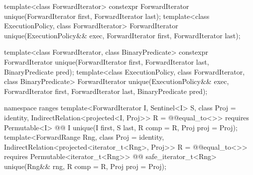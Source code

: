 %
\begin{itemdecl}
template<class ForwardIterator>
  constexpr ForwardIterator unique(ForwardIterator first, ForwardIterator last);
template<class ExecutionPolicy, class ForwardIterator>
  ForwardIterator unique(ExecutionPolicy&& exec,
                         ForwardIterator first, ForwardIterator last);

template<class ForwardIterator, class BinaryPredicate>
  constexpr ForwardIterator unique(ForwardIterator first, ForwardIterator last,
                                   BinaryPredicate pred);
template<class ExecutionPolicy, class ForwardIterator, class BinaryPredicate>
  ForwardIterator unique(ExecutionPolicy&& exec,
                         ForwardIterator first, ForwardIterator last,
                         BinaryPredicate pred);
\end{itemdecl}
\begin{addedblock}
%
\begin{itemdecl}
namespace ranges {
  template<ForwardIterator I, Sentinel<I> S, class Proj = identity,
      IndirectRelation<projected<I, Proj>> R = @@equal_to<>>
    requires Permutable<I>
    @@ I unique(I first, S last, R comp = R{}, Proj proj = Proj{});
  template<ForwardRange Rng, class Proj = identity,
      IndirectRelation<projected<iterator_t<Rng>, Proj>> R = @@equal_to<>>
    requires Permutable<iterator_t<Rng>>
    @@ safe_iterator_t<Rng>
      unique(Rng&& rng, R comp = R{}, Proj proj = Proj{});
}
\end{itemdecl}
\end{addedblock}

